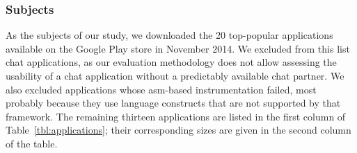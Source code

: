 \subsubsection{Subjects}
As the subjects of our study, we downloaded the 20 top-popular applications available on the Google Play store in November 2014. 
We excluded from this list chat applications, as our evaluation methodology does not allow assessing the usability of a chat application without a predictably available chat partner. 
We also excluded applications whose asm-based instrumentation failed, most probably because they use language constructs that are not supported by that framework.
The remaining thirteen applications are listed in the first column of Table~\ref{tbl:applications}; their corresponding sizes are given in the second column of the table. 



